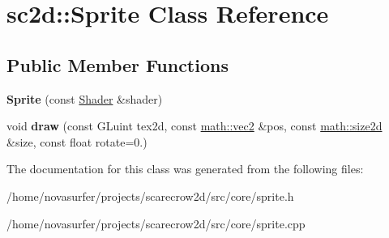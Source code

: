 \hypertarget{classsc2d_1_1Sprite}{}\section{sc2d\+:\+:Sprite Class Reference}
\label{classsc2d_1_1Sprite}
\subsection*{Public Member Functions}
\begin{DoxyCompactItemize}
\item 
\mbox{\label{classsc2d_1_1Sprite_a23f96ea9abf85e1c02fb97dfdbecba76}} 
{\bfseries Sprite} (const \hyperlink{classsc2d_1_1Shader}{Shader} \&shader)
\item 
\mbox{\label{classsc2d_1_1Sprite_a4ecd3b1fe1e5a34d7ebbf3f79b1ec8ca}} 
void {\bfseries draw} (const G\+Luint tex2d, const \hyperlink{structmath_1_1vec2}{math\+::vec2} \&pos, const \hyperlink{structmath_1_1size2d}{math\+::size2d} \&size, const float rotate=0.)
\end{DoxyCompactItemize}


The documentation for this class was generated from the following files\+:\begin{DoxyCompactItemize}
\item 
/home/novasurfer/projects/scarecrow2d/src/core/sprite.\+h\item 
/home/novasurfer/projects/scarecrow2d/src/core/sprite.\+cpp\end{DoxyCompactItemize}
